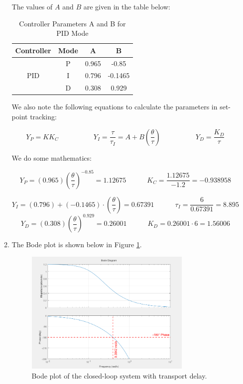 \documentclass[12pt]{article}
\begin{document}
\begin{enumerate}
\begin{enumerate}
    The values of \( A \) and \( B \) are given in the table below:

    \begin{table}[H]
      \centering
      \begin{tabular}{|c|c|c|c|}
      \hline
      \textbf{Controller} & \textbf{Mode} & \textbf{A} & \textbf{B} \\
      \hline
      \multirow{3}{*}{PID} & P & 0.965 & -0.85 \\
                           & I & 0.796 & -0.1465 \\
                           & D & 0.308 &  0.929 \\
      \hline
      \end{tabular}
      \caption{Controller Parameters A and B for PID Mode}
    \end{table}

    We also note the following equations to calculate the parameters in set-point tracking:

    \[
    Y_P = KK_C \quad \quad \quad \quad \quad
    Y_I = \frac{\tau}{\tau_I} = A + B \left( \frac{\theta}{\tau} \right) \quad \quad \quad \quad \quad
    Y_D = \frac{K_D}{\tau}
    \]

    We do some mathematics:

    $$
      Y_P = \left(0.965\right)\left(\frac{\theta}{\tau}\right)^{-0.85} = 1.12675 \quad \quad \quad 
      K_C = \frac{1.12675}{-1.2} = -0.938958
    $$

    $$
      Y_I = \left(0.796\right) + \left(-0.1465\right) \cdot \left(\frac{\theta}{\tau}\right) = 0.67391 \quad \quad \quad 
      \tau_I = \frac{6}{0.67391} = 8.895
    $$
    $$
      Y_D = \left(0.308\right)\left(\frac{\theta}{\tau}\right)^{0.929} = 0.26001 \quad \quad \quad 
      K_D = 0.26001 \cdot 6 = 1.56006
    $$

    \pagebreak

    \item
    The Bode plot is shown below in Figure \ref{fig:figure2_2}.

    \begin{figure}[H]
      \centering
      \includegraphics[width=0.8\textwidth]{Figures/figure2-2.png}
      \caption{Bode plot of the closed-loop system with transport delay.}
      \label{fig:figure2_2}
    \end{figure}


\end{enumerate}
\end{enumerate}
\end{document}
